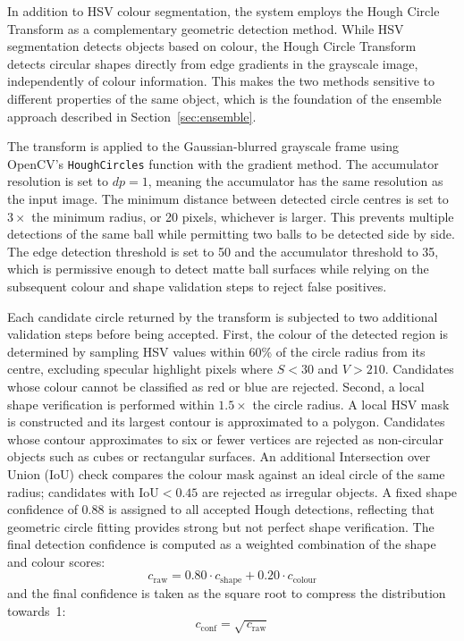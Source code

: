 
In addition to HSV colour segmentation, the system employs the Hough Circle
Transform as a complementary geometric detection method. While HSV segmentation
detects objects based on colour, the Hough Circle Transform detects circular shapes
directly from edge gradients in the grayscale image, independently of colour
information. This makes the two methods sensitive to different properties of the
same object, which is the foundation of the ensemble approach described in
Section~\ref{sec:ensemble}.

The transform is applied to the Gaussian-blurred grayscale frame using
OpenCV's \texttt{HoughCircles} function with the gradient method. The accumulator
resolution is set to $dp = 1$, meaning the accumulator has the same resolution as
the input image. The minimum distance between detected circle centres is set to
$3\times$ the minimum radius, or 20 pixels, whichever is larger. This prevents
multiple detections of the same ball while permitting two balls to be detected side
by side. The edge detection threshold is set to 50 and the accumulator threshold to
35, which is permissive enough to detect matte ball surfaces while relying on the
subsequent colour and shape validation steps to reject false positives.

Each candidate circle returned by the transform is subjected to two additional
validation steps before being accepted. First, the colour of the detected region is
determined by sampling HSV values within 60\% of the circle radius from its centre,
excluding specular highlight pixels where $S < 30$ and $V > 210$. Candidates whose
colour cannot be classified as red or blue are rejected. Second, a local shape
verification is performed within $1.5\times$ the circle radius. A local HSV mask is
constructed and its largest contour is approximated to a polygon. Candidates whose
contour approximates to six or fewer vertices are rejected as non-circular objects
such as cubes or rectangular surfaces. An additional Intersection over Union (IoU)
check compares the colour mask against an ideal circle of the same radius; candidates
with $\mathrm{IoU} < 0.45$ are rejected as irregular objects. A fixed shape
confidence of 0.88 is assigned to all accepted Hough detections, reflecting that
geometric circle fitting provides strong but not perfect shape verification.
The final detection confidence is computed as a weighted combination of the
shape and colour scores:
\begin{equation}
    c_{\mathrm{raw}} = 0.80 \cdot c_{\mathrm{shape}} + 0.20 \cdot c_{\mathrm{colour}}
\end{equation}
and the final confidence is taken as the square root to compress the distribution
towards~1:
\begin{equation}
    c_{\mathrm{conf}} = \sqrt{\,c_{\mathrm{raw}}}
\end{equation}

